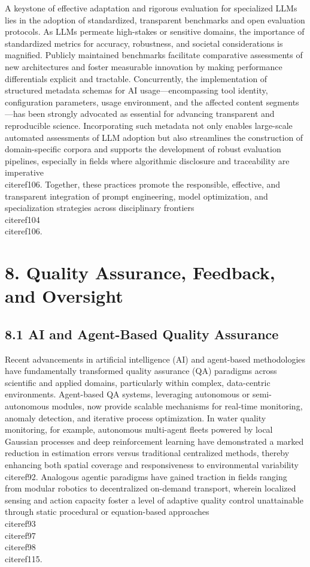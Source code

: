 \documentclass[11pt]{article}
\begin{document}
A keystone of effective adaptation and rigorous evaluation for specialized LLMs lies in the adoption of standardized, transparent benchmarks and open evaluation protocols. As LLMs permeate high-stakes or sensitive domains, the importance of standardized metrics for accuracy, robustness, and societal considerations is magnified. Publicly maintained benchmarks facilitate comparative assessments of new architectures and foster measurable innovation by making performance differentials explicit and tractable. Concurrently, the implementation of structured metadata schemas for AI usage—encompassing tool identity, configuration parameters, usage environment, and the affected content segments—has been strongly advocated as essential for advancing transparent and reproducible science. Incorporating such metadata not only enables large-scale automated assessments of LLM adoption but also streamlines the construction of domain-specific corpora and supports the development of robust evaluation pipelines, especially in fields where algorithmic disclosure and traceability are imperative \\cite{ref106}. Together, these practices promote the responsible, effective, and transparent integration of prompt engineering, model optimization, and specialization strategies across disciplinary frontiers \\cite{ref104}\\cite{ref106}.

\section{8. Quality Assurance, Feedback, and Oversight}

\subsection{8.1 AI and Agent-Based Quality Assurance}

Recent advancements in artificial intelligence (AI) and agent-based methodologies have fundamentally transformed quality assurance (QA) paradigms across scientific and applied domains, particularly within complex, data-centric environments. Agent-based QA systems, leveraging autonomous or semi-autonomous modules, now provide scalable mechanisms for real-time monitoring, anomaly detection, and iterative process optimization. In water quality monitoring, for example, autonomous multi-agent fleets powered by local Gaussian processes and deep reinforcement learning have demonstrated a marked reduction in estimation errors versus traditional centralized methods, thereby enhancing both spatial coverage and responsiveness to environmental variability \\cite{ref92}. Analogous agentic paradigms have gained traction in fields ranging from modular robotics to decentralized on-demand transport, wherein localized sensing and action capacity foster a level of adaptive quality control unattainable through static procedural or equation-based approaches \\cite{ref93}\\cite{ref97}\\cite{ref98}\\cite{ref115}.
\end{document}
